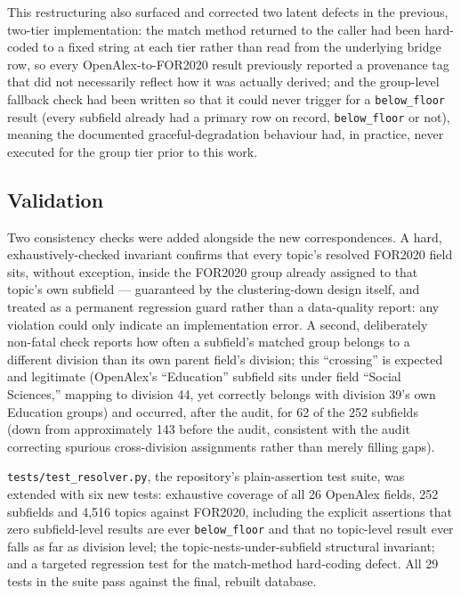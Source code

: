 \documentclass[11pt]{article}
\begin{document}
This restructuring also surfaced and corrected two latent defects in the previous,
two-tier implementation: the match method returned to the caller had been hard-coded to
a fixed string at each tier rather than read from the underlying bridge row, so every
OpenAlex-to-FOR2020 result previously reported a provenance tag that did not necessarily
reflect how it was actually derived; and the group-level fallback check had been written
so that it could never trigger for a \texttt{below\_floor} result (every subfield already
had a primary row on record, \texttt{below\_floor} or not), meaning the documented
graceful-degradation behaviour had, in practice, never executed for the group tier prior
to this work.

\subsection{Validation}
\label{sec:testing}

Two consistency checks were added alongside the new correspondences. A hard,
exhaustively-checked invariant confirms that every topic's resolved FOR2020 field sits,
without exception, inside the FOR2020 group already assigned to that topic's own
subfield --- guaranteed by the clustering-down design itself, and treated as a permanent
regression guard rather than a data-quality report: any violation could only indicate an
implementation error. A second, deliberately non-fatal check reports how often a
subfield's matched group belongs to a different division than its own parent field's
division; this ``crossing'' is expected and legitimate (OpenAlex's ``Education''
subfield sits under field ``Social Sciences,'' mapping to division 44, yet correctly
belongs with division 39's own Education groups) and occurred, after the audit, for 62
of the 252 subfields (down from approximately 143 before the audit, consistent with the
audit correcting spurious cross-division assignments rather than merely filling gaps).

\texttt{tests/test\_resolver.py}, the repository's plain-assertion test suite, was
extended with six new tests: exhaustive coverage of all 26 OpenAlex fields, 252
subfields and 4{,}516 topics against FOR2020, including the explicit assertions that
zero subfield-level results are ever \texttt{below\_floor} and that no topic-level result
ever falls as far as division level; the topic-nests-under-subfield structural
invariant; and a targeted regression test for the match-method hard-coding defect. All
29 tests in the suite pass against the final, rebuilt database.
\end{document}
